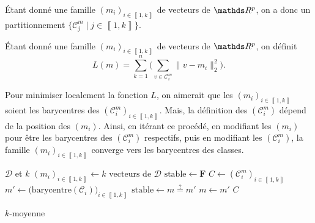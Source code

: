 Étant donné une famille $(m_i)_{i\in\left\llbracket 1,k \right\rrbracket}$\/ de vecteurs de $\R^p$, on a donc un partitionnement $\{\mathcal{C}^m_j  \mid j \in \left\llbracket 1,k \right\rrbracket\}$.

\begin{defn}
	Étant donné une famille $(m_i)_{i\in\left\llbracket 1,k \right\rrbracket}$\/ de vecteurs de $\R^p$, on définit \[
		L(m) = \sum_{k=1}^n \Big( \sum_{v \in \mathcal{C}^m_i} \|v - m_i\|_2^2 \Big)
	.\]
\end{defn}

Pour minimiser localement la fonction $L$, on aimerait que les $(m_i)_{i\in\left\llbracket 1,k \right\rrbracket}$\/ soient les barycentres des $(\mathcal{C}^m_i)_{i\in\left\llbracket 1,k \right\rrbracket}$. Mais, la définition des $(\mathcal{C}_i^m)$\/ dépend de la position des $(m_i)$. Ainsi, en itérant ce procédé, en modifiant les $(m_i)$\/ pour être les barycentres des $(\mathcal{C}_i^m)$\/ respectifs, puis en modifiant les $(\mathcal{C}_i^m)$, la famille $(m_i)_{i\in\left\llbracket 1,k \right\rrbracket }$\/ converge vers les barycentres des classes.

\begin{algorithm}[H]
	\centering
	\begin{algorithmic}[1]
		\Entree $\mathcal{D}$\/ et $k$\/ 
		\State $(m_i)_{i\in\left\llbracket 1,k \right\rrbracket} \gets k \text{ vecteurs de } \mathcal{D}$\/
		\State $\mathrm{stable} \gets \mathbf{F}$\/ 
			\State $C \gets (\mathcal{C}^m_i)_{i\in\left\llbracket 1,k \right\rrbracket}$\/
			\State $m' \gets \big(\mathrm{barycentre}(\mathcal{C}_i)\big)_{i \in \left\llbracket 1,k \right\rrbracket}$\/
			\State $\mathrm{stable} \gets m \mathrel{\overset?=} m'$\/
			\State $m \gets m'$\/
		\EndWhile
		\State \Return $C$\/
	\end{algorithmic}
	\caption{$k$-moyenne}
\end{algorithm}

